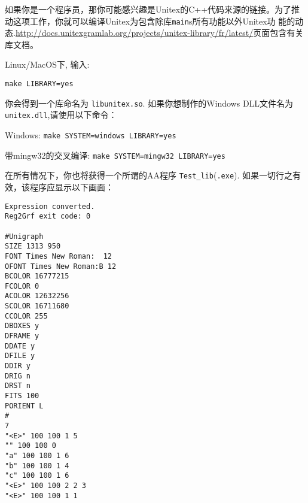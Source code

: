 如果你是一个程序员，那你可能感兴趣是Unitex的C++代码来源的链接。为了推动这项工作，你就可以编译Unitex为包含除库\verb+main+s所有功能以外Unitex功
能的动态.\url{http://docs.unitexgramlab.org/projects/unitex-library/fr/latest/}页面包含有关库文档。


\bigskip
Linux/MacOS下, 输入:

\bigskip
\verb+make LIBRARY=yes+

\bigskip
\noindent 你会得到一个库命名为 \verb+libunitex.so+. 如果你想制作的Windows DLL文件名为\verb+unitex.dll+,请使用以下命令：

\bigskip
Windows: \verb+make SYSTEM=windows LIBRARY=yes+

带mingw32的交叉编译: \verb+make SYSTEM=mingw32 LIBRARY=yes+

\bigskip
\noindent 在所有情况下，你也将获得一个所谓的AA程序
\verb+Test_lib+(\verb+.exe+). 
如果一切行之有效，该程序应显示以下画面：

\begin{verbatim}
Expression converted.
Reg2Grf exit code: 0

#Unigraph
SIZE 1313 950
FONT Times New Roman:  12
OFONT Times New Roman:B 12
BCOLOR 16777215
FCOLOR 0
ACOLOR 12632256
SCOLOR 16711680
CCOLOR 255
DBOXES y
DFRAME y
DDATE y
DFILE y
DDIR y
DRIG n
DRST n
FITS 100
PORIENT L
#
7
"<E>" 100 100 1 5
"" 100 100 0
"a" 100 100 1 6
"b" 100 100 1 4
"c" 100 100 1 6
"<E>" 100 100 2 2 3
"<E>" 100 100 1 1
\end{verbatim}

